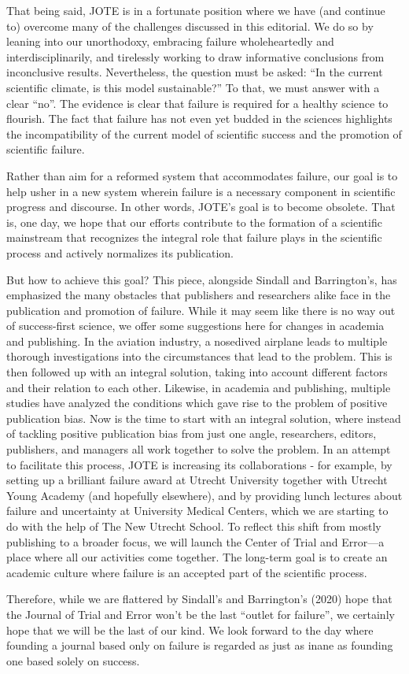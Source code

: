 \documentclass[editorial, authordate,twocolumn,issue]{jote-new-article}
\begin{document}
That being said, JOTE is in a fortunate position where we have (and continue to) overcome many of the challenges discussed in this editorial. We do so by leaning into our unorthodoxy, embracing failure wholeheartedly and interdisciplinarily, and tirelessly working to draw informative conclusions from inconclusive results. Nevertheless, the question must be asked: “In the current scientific climate, is this model sustainable?” To that, we must answer with a clear “no”. The evidence is clear that failure is required for a healthy science to flourish. The fact that failure has not even yet budded in the sciences highlights the incompatibility of the current model of scientific success and the promotion of scientific failure. 

Rather than aim for a reformed system that accommodates failure, our goal is to help usher in a new system wherein failure is a necessary component in scientific progress and discourse. In other words, JOTE's goal is to become obsolete. That is, one day, we hope that our efforts contribute to the formation of a scientific mainstream that recognizes the integral role that failure plays in the scientific process and actively normalizes its publication. 

But how to achieve this goal? This piece, alongside Sindall and Barrington's, has emphasized the many obstacles that publishers and researchers alike face in the publication and promotion of failure. While it may seem like there is no way out of success-first science, we offer some suggestions here for changes in academia and publishing. In the aviation industry, a nosedived airplane leads to multiple thorough investigations into the circumstances that lead to the problem. This is then followed up with an integral solution, taking into account different factors and their relation to each other. Likewise, in academia and publishing, multiple studies have analyzed the conditions which gave rise to the problem of positive publication bias. Now is the time to start with an integral solution, where instead of tackling positive publication bias from just one angle, researchers, editors, publishers, and managers all work together to solve the problem. In an attempt to facilitate this process, JOTE is increasing its collaborations - for example, by setting up a brilliant failure award at Utrecht University together with Utrecht Young Academy (and hopefully elsewhere), and by providing lunch lectures about failure and uncertainty at University Medical Centers, which we are starting to do with the help of The New Utrecht School. To reflect this shift from mostly publishing to a broader focus, we will launch the Center of Trial and Error—a place where all our activities come together. The long-term goal is to create an academic culture where failure is an accepted part of the scientific process. 

Therefore, while we are flattered by Sindall's and Barrington's (2020) hope that the Journal of Trial and Error won't be the last “outlet for failure”, we certainly hope that we will be the last of our kind. We look forward to the day where founding a journal based only on failure is regarded as just as inane as founding one based solely on success. 

\printbibliography
\end{document}
